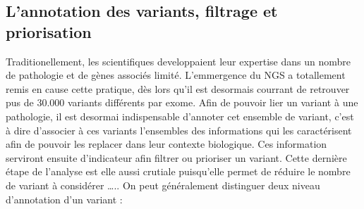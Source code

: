 \documentclass[12pt,twoside]{reedthesis}
\theoremstyle{definition}
\theoremstyle{definition}
\theoremstyle{remark}
\begin{document}
  \subsection{L'annotation des variants, filtrage et
  priorisation}\label{lannotation-des-variants-filtrage-et-priorisation}
  
  Traditionellement, les scientifiques developpaient leur expertise dans
  un nombre de pathologie et de gènes associés limité. L'emmergence du NGS
  a totallement remis en cause cette pratique, dès lors qu'il est
  desormais courrant de retrouver pus de 30.000 variants différents par
  exome. Afin de pouvoir lier un variant à une pathologie, il est desormai
  indispensable d'annoter cet ensemble de variant, c'est à dire d'associer
  à ces variants l'ensembles des informations qui les caractérisent afin
  de pouvoir les replacer dans leur contexte biologique. Ces information
  serviront ensuite d'indicateur afin filtrer ou prioriser un variant.
  Cette dernière étape de l'analyse est elle aussi crutiale puisqu'elle
  permet de réduire le nombre de variant à considérer \ldots{}.. On peut
  généralement distinguer deux niveau d'annotation d'un variant :
  
\end{document}
